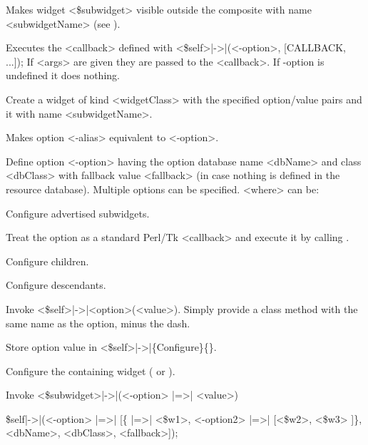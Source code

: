 \begin{enum}{1cm}

Makes widget <\$subwidget> visible outside the composite with name <subwidgetName>
(see ).

Executes the <callback> defined with <\$self>|->|(<-option>, [CALLBACK, ...]);
If <args> are given they are passed to the <callback>.
If -option is undefined it does nothing.

Create a widget of kind <widgetClass> with the specified option/value pairs and 
it with name <subwidgetName>.

Makes option <-alias> equivalent to <-option>.

Define  option <-option> having the option database name <dbName> and class <dbClass>
with fallback value <fallback> (in case nothing is defined in the resource database).  Multiple options 
can be specified.  <where> can be:

Configure advertised subwidgets.

Treat the option as a standard Perl/Tk <callback> and execute it
by calling .

Configure children.

Configure descendants.

Invoke <\$self>|->|<option>(<value>).  Simply provide a class method
with the same name as the option, minus the dash.

Store option value in <\$self>|->|\{Configure\}\{<-option>\}.

Configure the containing widget ( or ).

Invoke <\$subwidget>|->|(<-option> |=>| <value>)

   \item[\$self|->|\kwd{ConfigSpecs}(<-option> |=>| [\{<-option1> |=>| <\$w1>, <-option2> |=>| [<\$w2>, <\$w3>]]\},
  <dbName>, <dbClass>, <fallback>]);\strut\newline


\end{enum}
